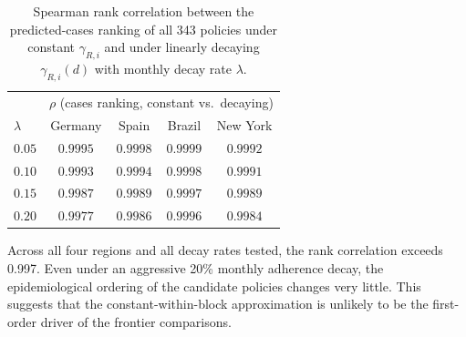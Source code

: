 \documentclass[msom,blindrev]{informs3} %
\newcommand{\rev}[1]{{\color{blue}#1}}
\begin{document}
\begin{APPENDICES}
\begin{table}[htbp!]
\centering
{\color{blue}
\begin{tabular}{|l|cccc|}
\hline
& \multicolumn{4}{c|}{$\rho$ (cases ranking, constant vs.\ decaying)} \\
$\lambda$ & Germany & Spain & Brazil & New York \\\hline
$0.05$ & $0.9995$ & $0.9998$ & $0.9999$ & $0.9992$ \\
$0.10$ & $0.9993$ & $0.9994$ & $0.9998$ & $0.9991$ \\
$0.15$ & $0.9987$ & $0.9989$ & $0.9997$ & $0.9989$ \\
$0.20$ & $0.9977$ & $0.9986$ & $0.9996$ & $0.9984$ \\\hline
\end{tabular}
}
\caption{\rev{Spearman rank correlation between the predicted-cases ranking of all 343 policies under constant $\gamma_{R,i}$ and under linearly decaying $\gamma_{R,i}(d)$ with monthly decay rate $\lambda$.}}
\label{tab:adherence_decay_rho}
\end{table}

{\color{blue}
Across all four regions and all decay rates tested, the rank correlation exceeds 0.997. Even under an aggressive 20\% monthly adherence decay, the epidemiological ordering of the candidate policies changes very little. This suggests that the constant-within-block approximation is unlikely to be the first-order driver of the frontier comparisons.}





\end{APPENDICES}
\end{document}
